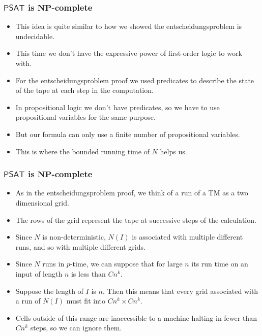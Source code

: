 \documentclass[handout]{beamer}
\newcommand{\NP}{\mathbf{NP}}
\newcommand{\SAT}{\mathsf{PSAT}}
\begin{document}
\begin{frame}
\frametitle{$\SAT$ is $\NP$-complete}
\begin{itemize}
\item This idea is quite similar to how we showed the entscheidungsproblem is undecidable. 
\vspace{0.3cm}
\item This time we don't have the expressive power of first-order logic to work with. 
\vspace{0.3cm}
\item For the entscheidungsproblem proof we used predicates to describe the state of the tape at each step in the computation. 
\vspace{0.3cm}
\item In propositional logic we don't have predicates, so we have to use propositional variables for the same purpose. 
\vspace{0.3cm}
\item But our formula can only use a finite number of propositional variables.
\vspace{0.3cm} 
\item This is where the bounded running time of $N$ helps us.
\end{itemize} 
\end{frame}

\begin{frame}
\frametitle{$\SAT$ is $\NP$-complete}
\begin{itemize}
\item As in the entscheidungsproblem proof, we think of a run of a TM as a two dimensional grid. 
\vspace{0.3cm}
\item The rows of the grid represent the tape at successive steps of the calculation. 
\vspace{0.3cm}
\item Since $N$ is non-deterministic, $N(I)$ is associated with multiple different runs, and so with multiple different grids. 
\vspace{0.3cm}
\item Since $N$ runs in $p$-time, we can suppose that for large $n$ its run time on an input of length $n$ is less than $Cn^k$. 
\vspace{0.3cm}
\item Suppose the length of $I$ is $n$. Then this means that every grid associated with a run of $N(I)$ must fit into $Cn^k\times Cn^k$. 
\vspace{0.3cm}
\item Cells outside of this range are inaccessible to a machine halting in fewer than $Cn^k$ steps, so we can ignore them.
\end{itemize} 
\end{frame}
\end{document}
